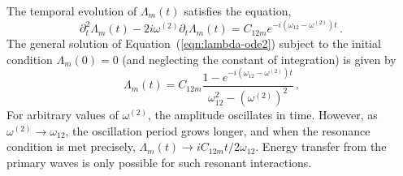 The temporal evolution of $\Lambda_m(t)$ satisfies the equation,
\begin{equation}\label{eqn:lambda-ode2}
	\partial^2_t \Lambda_m(t) - 2i\omega^{(2)} \partial_t \Lambda_m(t) = C_{12m} e^{-i (\omega_{12}-\omega^{(2)})t} \, .
\end{equation}
The general solution of Equation~(\ref{eqn:lambda-ode2}) subject to the initial condition $\Lambda_m(0)=0$ (and neglecting the constant of integration) is given by
%
\begin{equation}
	\Lambda_m(t) = C_{12m} \frac{1 - e^{-i(\omega_{12} - \omega^{(2)})t}}{\omega_{12}^2 - (\omega^{(2)})^2} \, .
\end{equation}
%
For arbitrary values of $\omega^{(2)}$, the amplitude
oscillates in time. However, as $\omega^{(2)} \rightarrow \omega_{12}$, the oscillation period grows longer, and when the resonance condition is met precisely, $\Lambda_m(t) \rightarrow i C_{12m} t / 2 \omega_{12}$. Energy transfer from the primary waves is only possible for such resonant interactions.

